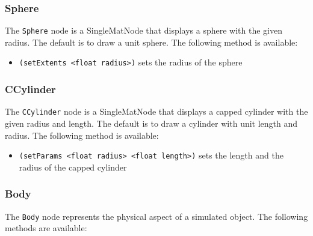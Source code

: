 \subsubsection{Sphere}
The \texttt{Sphere} node is a SingleMatNode that displays a sphere
with the given radius. The default is to draw a unit sphere. The
following method is available:

\begin{itemize}
\item \texttt{(setExtents <float radius>)} sets the radius of the sphere
\end{itemize}

\subsubsection{CCylinder}
The \texttt{CCylinder} node is a SingleMatNode that displays a capped
cylinder with the given radius and length. The default is to draw a
cylinder with unit length and radius. The following method is
available:

\begin{itemize}
\item \texttt{(setParams <float radius> <float length>)} sets the
  length and the radius of the capped cylinder
\end{itemize}

\subsubsection{Body}
The \texttt{Body} node represents the physical aspect of a simulated
object. The following methods are available:

